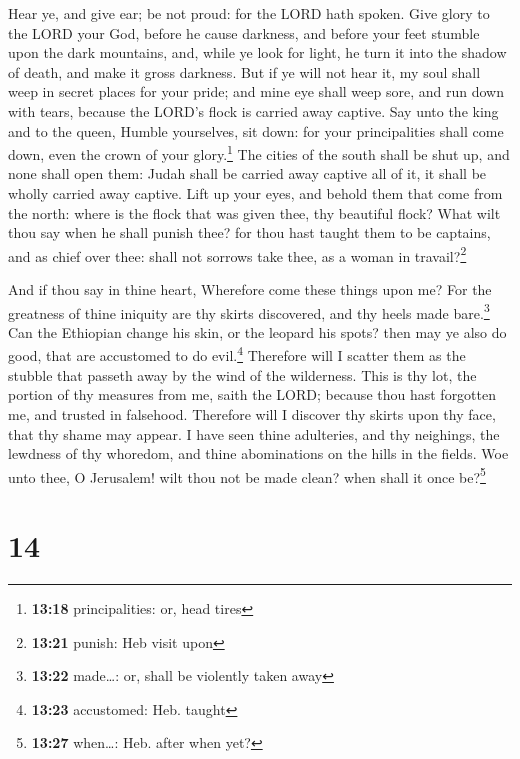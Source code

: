  Hear ye, and give ear; be not proud: for the LORD hath
spoken.  Give glory to the LORD your God, before he cause
darkness, and before your feet stumble upon the dark mountains, and,
while ye look for light, he turn it into the shadow of death, and make
it gross darkness.  But if ye will not hear it, my soul
shall weep in secret places for your pride; and mine eye shall weep
sore, and run down with tears, because the LORD's flock is carried away
captive.  Say unto the king and to the queen, Humble
yourselves, sit down: for your principalities shall come down, even the
crown of your glory.\footnote{\textbf{13:18} principalities: or, head
  tires}  The cities of the south shall be shut up, and
none shall open them: Judah shall be carried away captive all of it, it
shall be wholly carried away captive.  Lift up your eyes,
and behold them that come from the north: where is the flock that was
given thee, thy beautiful flock?  What wilt thou say when
he shall punish thee? for thou hast taught them to be captains, and as
chief over thee: shall not sorrows take thee, as a woman in
travail?\footnote{\textbf{13:21} punish: Heb visit upon}

 And if thou say in thine heart, Wherefore come these
things upon me? For the greatness of thine iniquity are thy skirts
discovered, and thy heels made bare.\footnote{\textbf{13:22} made\ldots:
  or, shall be violently taken away}  Can the Ethiopian
change his skin, or the leopard his spots? then may ye also do good,
that are accustomed to do evil.\footnote{\textbf{13:23} accustomed: Heb.
  taught}  Therefore will I scatter them as the stubble
that passeth away by the wind of the wilderness.  This is
thy lot, the portion of thy measures from me, saith the LORD; because
thou hast forgotten me, and trusted in falsehood. 
Therefore will I discover thy skirts upon thy face, that thy shame may
appear.  I have seen thine adulteries, and thy neighings,
the lewdness of thy whoredom, and thine abominations on the hills in the
fields. Woe unto thee, O Jerusalem! wilt thou not be made clean? when
shall it once be?\footnote{\textbf{13:27} when\ldots: Heb. after when
  yet?}

\hypertarget{section-13}{%
\section{14}\label{section-13}}

